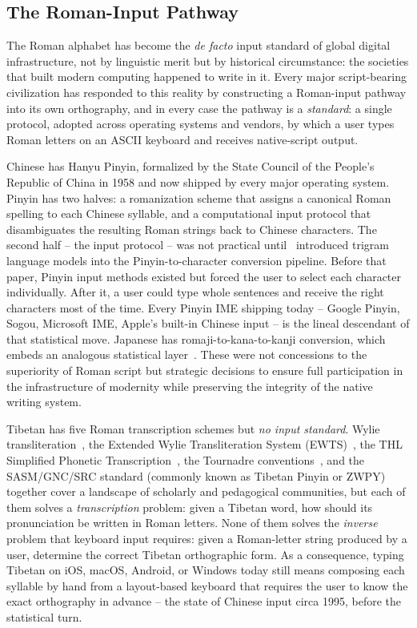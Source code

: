 \documentclass[11pt]{article}
\begin{document}
\subsection{The Roman-Input Pathway}

The Roman alphabet has become the \emph{de facto} input standard of global digital infrastructure, not by linguistic merit but by historical circumstance: the societies that built modern computing happened to write in it. Every major script-bearing civilization has responded to this reality by constructing a Roman-input pathway into its own orthography, and in every case the pathway is a \emph{standard}: a single protocol, adopted across operating systems and vendors, by which a user types Roman letters on an ASCII keyboard and receives native-script output.

Chinese has Hanyu Pinyin, formalized by the State Council of the People's Republic of China in 1958 and now shipped by every major operating system. Pinyin has two halves: a romanization scheme that assigns a canonical Roman spelling to each Chinese syllable, and a computational input protocol that disambiguates the resulting Roman strings back to Chinese characters. The second half -- the input protocol -- was not practical until~\citet{chen2000pinyin} introduced trigram language models into the Pinyin-to-character conversion pipeline. Before that paper, Pinyin input methods existed but forced the user to select each character individually. After it, a user could type whole sentences and receive the right characters most of the time. Every Pinyin IME shipping today -- Google Pinyin, Sogou, Microsoft IME, Apple's built-in Chinese input -- is the lineal descendant of that statistical move. Japanese has romaji-to-kana-to-kanji conversion, which embeds an analogous statistical layer~\cite{takahashi1996kana}. These were not concessions to the superiority of Roman script but strategic decisions to ensure full participation in the infrastructure of modernity while preserving the integrity of the native writing system.

Tibetan has five Roman transcription schemes but \emph{no input standard}. Wylie transliteration~\cite{wylie1959}, the Extended Wylie Transliteration System (EWTS)~\cite{ewts}, the THL Simplified Phonetic Transcription~\cite{thl}, the Tournadre conventions~\cite{tournadre2003}, and the SASM/GNC/SRC standard (commonly known as Tibetan Pinyin or ZWPY)~\cite{sasm1982} together cover a landscape of scholarly and pedagogical communities, but each of them solves a \emph{transcription} problem: given a Tibetan word, how should its pronunciation be written in Roman letters. None of them solves the \emph{inverse} problem that keyboard input requires: given a Roman-letter string produced by a user, determine the correct Tibetan orthographic form. As a consequence, typing Tibetan on iOS, macOS, Android, or Windows today still means composing each syllable by hand from a layout-based keyboard that requires the user to know the exact orthography in advance -- the state of Chinese input circa 1995, before the statistical turn.
\end{document}
